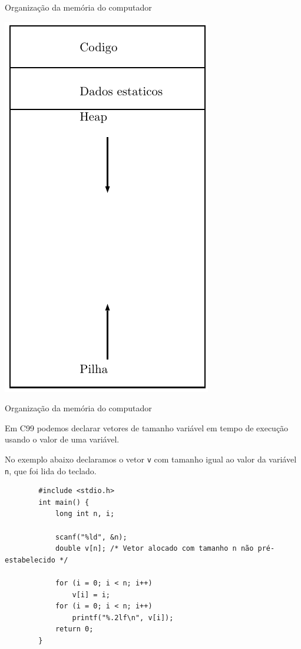 \documentclass[handout]{beamer}
\newcommand{\cod}[1]{\texttt{#1}}
\begin{document}
\begin{frame}[fragile]{Organização da memória do computador}

    \begin{center}
        \includegraphics[scale=0.6]{memoria.pdf}
    \end{center}

\end{frame}

\begin{frame}[fragile]{Organização da memória do computador}

    \small
    Em C99 podemos declarar vetores de tamanho variável em tempo de execução usando o valor de uma variável.

    No exemplo abaixo declaramos o vetor \cod{v} com tamanho igual ao valor da variável \cod{n}, que foi lida do teclado.
    \vspace{-0.3cm}

    \begin{verbatim}
        #include <stdio.h>
        int main() {
            long int n, i;

            scanf("%ld", &n);
            double v[n]; /* Vetor alocado com tamanho n não pré-estabelecido */

            for (i = 0; i < n; i++)
                v[i] = i;
            for (i = 0; i < n; i++) 
                printf("%.2lf\n", v[i]);
            return 0;
        }
     \end{verbatim}

\end{frame}
\end{document}
